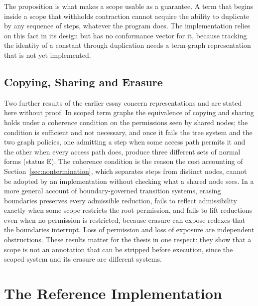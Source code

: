 \documentclass[11pt]{article}
\theoremstyle{definition}
\theoremstyle{remark}
\newcommand{\Et}{status E}
\begin{document}
The proposition is what makes a scope usable as a guarantee. A term that begins inside a scope that withholds contraction cannot acquire the ability to duplicate by any sequence of steps, whatever the program does. The implementation relies on this fact in its design but has no conformance vector for it, because tracking the identity of a constant through duplication needs a term-graph representation that is not yet implemented.

\subsection{Copying, Sharing and Erasure}

Two further results of the earlier essay concern representations and are stated here without proof. In scoped term graphs the equivalence of copying and sharing holds under a coherence condition on the permissions seen by shared nodes; the condition is sufficient and not necessary, and once it fails the tree system and the two graph policies, one admitting a step when some access path permits it and the other when every access path does, produce three different sets of normal forms (\Et). The coherence condition is the reason the cost accounting of Section~\ref{sec:nontermination}, which separates steps from distinct nodes, cannot be adopted by an implementation without checking what a shared node sees. In a more general account of boundary-governed transition systems, erasing boundaries preserves every admissible reduction, fails to reflect admissibility exactly when some scope restricts the root permission, and fails to lift reductions even when no permission is restricted, because erasure can expose redexes that the boundaries interrupt. Loss of permission and loss of exposure are independent obstructions. These results matter for the thesis in one respect: they show that a scope is not an annotation that can be stripped before execution, since the scoped system and its erasure are different systems.


\section{The Reference Implementation}\label{sec:kernel}
\end{document}
